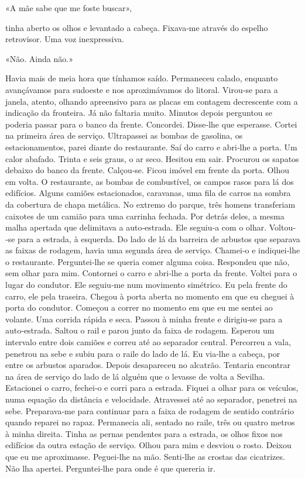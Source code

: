 «A mãe sabe que me foste buscar»,

tinha aberto os olhos e levantado a cabeça. Fixava­‑me através do
espelho retrovisor. Uma voz inexpressiva.

«Não. Ainda não.»

Havia mais de meia hora que tínhamos saído. Permaneceu calado, enquanto
avançávamos para sudoeste e nos aproximávamos do litoral. Virou­‑se para
a janela, atento, olhando apreensivo para as placas em contagem
decrescente com a indicação da fronteira. Já não faltaria muito. Minutos
depois perguntou se poderia passar para o banco da frente. Concordei.
Disse­‑lhe que esperasse. Cortei na primeira área de serviço.
Ultrapassei as bombas de gasolina, os estacionamentos, parei diante do
restaurante. Saí do carro e abri­‑lhe a porta. Um calor abafado. Trinta
e seis graus, o ar seco. Hesitou em sair. Procurou os sapatos debaixo do
banco da frente. Calçou­‑se. Ficou imóvel em frente da porta. Olhou em
volta. O restaurante, as bombas de combustível, os campos rasos para lá
dos edifícios. Alguns camiões estacionados, caravanas, uma fila de
carros na sombra da cobertura de chapa metálica. No extremo do parque,
três homens transferiam caixotes de um camião para uma carrinha fechada.
Por detrás deles, a mesma malha apertada que delimitava a auto­‑estrada.
Ele seguiu­‑a com o olhar. Voltou­‑se para a estrada, à esquerda. Do
lado de lá da barreira de arbustos que separava as faixas de rodagem,
havia uma segunda área de serviço. Chamei­‑o e indiquei­‑lhe o
restaurante. Perguntei­‑lhe se queria comer alguma coisa. Respondeu que
não, sem olhar para mim. Contornei o carro e abri­‑lhe a porta da
frente. Voltei para o lugar do condutor. Ele seguiu­‑me num movimento
simétrico. Eu pela frente do carro, ele pela traseira. Chegou à porta
aberta no momento em que eu cheguei à porta do condutor. Começou a
correr no momento em que eu me sentei ao volante. Uma corrida rápida e
seca. Passou à minha frente e dirigiu­‑se para a auto­‑estrada. Saltou o
rail e parou junto da faixa de rodagem. Esperou um intervalo entre dois
camiões e correu até ao separador central. Percorreu a vala, penetrou na
sebe e subiu para o raile do lado de lá. Eu via­‑lhe a cabeça, por entre
os arbustos aparados. Depois desapareceu no alcatrão. Tentaria encontrar
na área de serviço do lado de lá alguém que o levasse de volta a
Sevilha. Estacionei o carro, fechei­‑o e corri para a estrada. Fiquei a
olhar para os veículos, numa equação da distância e velocidade.
Atravessei até ao separador, penetrei na sebe. Preparava­‑me para
continuar para a faixa de rodagem de sentido contrário quando reparei no
rapaz. Permanecia ali, sentado no raile, três ou quatro metros à minha
direita. Tinha as pernas pendentes para a estrada, os olhos fixos nos
edifícios da outra estação de serviço. Olhou para mim e desviou o rosto.
Deixou que eu me aproximasse. Peguei­‑lhe na mão. Senti­‑lhe as crostas
das cicatrizes. Não lha apertei. Perguntei­‑lhe para onde é que quereria
ir.

